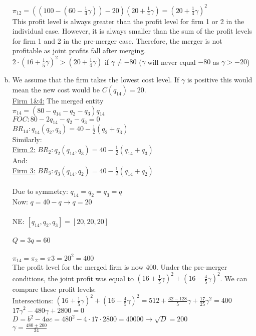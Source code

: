 \documentclass[a4paper]{article}
\begin{document}
\begin{enumerate}[(a)]
$\pi_{12}=((100-(60-\frac{1}{4}\gamma))-20)(20+\frac{1}{4}\gamma)=(20+\frac{1}{4}\gamma)^2$\\
This profit level is always greater than the profit level for firm 1 or 2 in the individual case. However, it is always smaller than the sum of the profit levels for firm 1 and 2 in the pre-merger case. Therefore, the merger is not profitable as joint profits fall after merging. \\
$2\cdot(16+\frac{1}{5}\gamma)^2> (20+\frac{1}{4}\gamma) $ if $ \gamma\ne -80$  \space  ($\gamma$ will never equal $-80$ as $\gamma>-20$)
\item
We assume that the firm takes the lowest cost level. If $\gamma$ is positive this would mean the new cost would be $C(q_{14})=20$.\\
\underline{Firm 1\&4:} The merged entity\\
$\pi_{14}=(80-q_{14}-q_2-q_3)q_{14}$\\
$FOC:80-2q_{14}-q_2-q_3=0$\\
$BR_{14}:q_{14}(q_2,q_3)=40-\frac{1}{2}(q_2+q_3)$\\
Similarly:\\
\underline{Firm 2:} $BR_2:q_2(q_{14},q_3)=40-\frac{1}{2}(q_{14}+q_3)$\\
And:
\\
\underline{Firm 3:} $BR_3:q_3(q_{14},q_2)=40-\frac{1}{2}(q_{14}+q_2)$\\
\\
Due to symmetry: $q_{14}=q_2=q_3=q$\\
Now: $q=40-q \rightarrow q=20$\\
\\
NE: $[q_{14},q_2,q_3]=[20,20,20]$\\
\\
$Q=3q=60$\\
\\
$\pi_{14}=\pi_2=\pi3=20^2=400$\\
The profit level for the merged firm is now 400. Under the pre-merger conditions, the joint profit was equal to
 $(16+\frac{1}{5}\gamma)^2+(16-\frac{4}{5}\gamma)^2$. We can compare these profit levels:\\
Intersections:
$(16+\frac{1}{5}\gamma)^2+(16-\frac{4}{5}\gamma)^2=512+\frac{32-128}{5}\gamma+\frac{17}{25}\gamma^2=400$
\\$17\gamma^2-480\gamma+2800=0$\\
$D=b^2-4ac=480^2-4\cdot17\cdot2800=40000\rightarrow\sqrt{D}=200$\\
$\gamma=\frac{480\pm200}{34}$\\

\end{enumerate}
\end{document}

